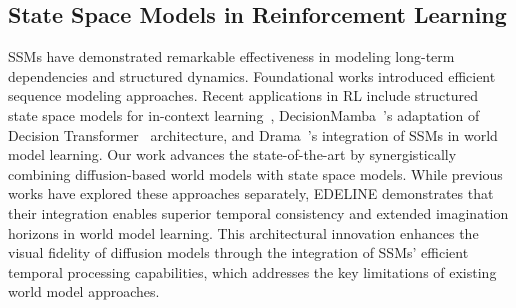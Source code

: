 \subsection{State Space Models in Reinforcement Learning}
\vspace{-0.7em}
SSMs have demonstrated remarkable effectiveness in modeling long-term dependencies and structured dynamics. Foundational works \cite{hippo, gu2022efficiently, gupta2022diagonal, gu2022parameterizationinitializationdiagonalstate, smith2023simplified, hasani2023liquid, gu2024mamba, dao2024transformersssmsgeneralizedmodels} introduced efficient sequence modeling approaches. Recent applications in RL include structured state space models for in-context learning~\cite{lu2023structured}, DecisionMamba~\cite{huang2024decisionmamba}'s adaptation of Decision Transformer~\cite{chen2021decision} architecture, and Drama~\cite{anonymous2025drama}'s integration of SSMs in world model learning.
%
Our work advances the state-of-the-art by synergistically combining diffusion-based world models with state space models. While previous works have explored these approaches separately, EDELINE demonstrates that their integration enables superior temporal consistency and extended imagination horizons in world model learning. This architectural innovation enhances the visual fidelity of diffusion models through the integration of SSMs' efficient temporal processing capabilities, which addresses the key limitations of existing world model approaches.
